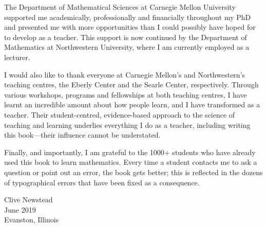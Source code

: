 The Department of Mathematical Sciences at Carnegie Mellon University supported me academically, professionally and financially throughout my PhD and presented me with more opportunities than I could possibly have hoped for to develop as a teacher. This support is now continued by the Department of Mathematics at Northwestern University, where I am currently employed as a lecturer.

I would also like to thank everyone at Carnegie Mellon's and Northwestern's teaching centres, the Eberly Center and the Searle Center, respectively. Through various workshops, programs and fellowships at both teaching centres, I have learnt an incredible amount about how people learn, and I have transformed as a teacher. Their student-centred, evidence-based approach to the science of teaching and learning underlies everything I do as a teacher, including writing this book---their influence cannot be understated.

Finally, and importantly, I am grateful to the 1000+ students who have already used this book to learn mathematics. Every time a student contacts me to ask a question or point out an error, the book gets better; this is reflected in the dozens of typographical errors that have been fixed as a consequence.

\begin{flushright}
Clive Newstead\\
June 2019\\
Evanston, Illinois
\end{flushright}